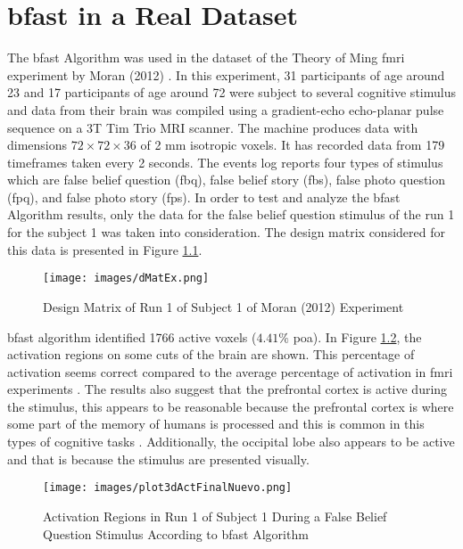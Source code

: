 \chapter{\texorpdfstring{\gls{bfast}}{BFAST} in a Real Dataset}

The \gls{bfast} Algorithm was used in the dataset of the Theory of Ming \gls{fmri} experiment 
by Moran (2012) \cite{moran2012social}. 
In this experiment, 31 participants of age around 23 and 17 participants of age around 72 were 
subject to several cognitive stimulus and data from their brain was compiled using a
gradient-echo echo-planar pulse sequence on a 3T Tim Trio MRI scanner. The machine produces data with  
dimensions $72\times72\times36$ of 2 mm isotropic voxels. It has 
recorded data from 179 timeframes taken every 2 seconds. The events log reports four types of stimulus 
which are false belief question (fbq), false belief story (fbs), false photo question (fpq), and 
false photo story (fps). In order to test and analyze the \gls{bfast} Algorithm results, only 
the data for the false belief question stimulus of the run 1 for the subject 1 was taken into 
consideration. The design matrix considered for this data is presented in Figure \ref{fig:desMatEx}.

\begin{figure}
\centering
\texttt{[image: images/dMatEx.png]}
\caption{Design Matrix of Run 1 of Subject 1 of Moran (2012) Experiment}
\label{fig:desMatEx}
\end{figure}

\gls{bfast} algorithm identified 1766 active voxels ($4.41\%$ \gls{poa}). In Figure
\ref{fig:realDataYZ}, the activation regions on some cuts of the brain are shown. 
This percentage of activation seems correct compared to the average percentage of activation in
\gls{fmri} experiments \cite{lazar2008statistical}. The results also suggest that the prefrontal 
cortex is active during the stimulus, this appears to be reasonable because the prefrontal cortex is 
where some part of the memory of humans is processed and this is common in this types of cognitive 
tasks \cite{amin2012brain}. Additionally, the occipital lobe also appears to be active and that is
because the stimulus are presented visually.

\begin{figure}[htbp!]
\centering
\texttt{[image: images/plot3dActFinalNuevo.png]}
\caption{Activation Regions in Run 1 of Subject 1 During a False Belief Question Stimulus According to \gls{bfast} Algorithm}
\label{fig:realDataYZ}
\end{figure}
